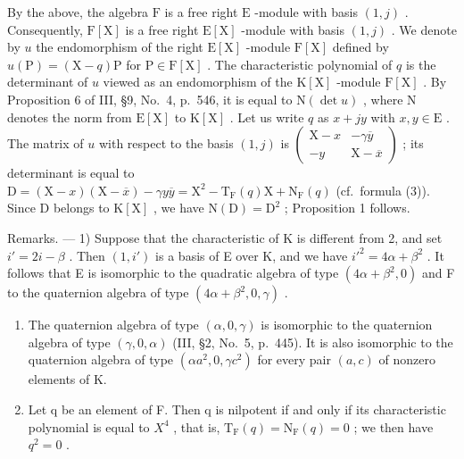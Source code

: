 By the above, the algebra \(\mathrm{F}\) is a free right \(\mathrm{E}\) -module with basis \((1,j)\) . Consequently, \(\mathrm{F}[\mathrm{X}]\) is a free right \(\mathrm{E}[\mathrm{X}]\) -module with basis \((1,j)\) . We denote by \(u\) the endomorphism of the right \(\mathrm{E}[\mathrm{X}]\) -module \(\mathrm{F}[\mathrm{X}]\) defined by \(u(\mathrm{P}) = (\mathrm{X} - q)\mathrm{P}\) for \(\mathrm{P} \in \mathrm{F}[\mathrm{X}]\) . The characteristic polynomial of \(q\) is the determinant of \(u\) viewed as an endomorphism of the \(\mathrm{K}[\mathrm{X}]\) -module \(\mathrm{F}[\mathrm{X}]\) . By Proposition 6 of III, §9, No.~4, p.~546, it is equal to \(\mathrm{N}(\det u)\) , where \(\mathrm{N}\) denotes the norm from \(\mathrm{E}[\mathrm{X}]\) to \(\mathrm{K}[\mathrm{X}]\) . Let us write \(q\) as \(x + jy\) with \(x, y \in \mathrm{E}\) . The matrix of \(u\) with respect to the basis \((1,j)\) is \(\begin{pmatrix} \mathrm{X} - x & -\gamma \overline{y} \\ -y & \mathrm{X} - \overline{x} \end{pmatrix}\) ; its determinant is equal to \(\mathrm{D} = (\mathrm{X} - x)(\mathrm{X} - \overline{x}) - \gamma y\overline{y} = \mathrm{X}^2 - \mathrm{T}_{\mathrm{F}}(q)\mathrm{X} + \mathrm{N}_{\mathrm{F}}(q)\) (cf.~formula (3)). Since \(\mathrm{D}\) belongs to \(\mathrm{K}[\mathrm{X}]\) , we have \(\mathrm{N}(\mathrm{D}) = \mathrm{D}^2\) ; Proposition 1 follows.

Remarks. --- 1) Suppose that the characteristic of K is different from 2, and set \(i' = 2i - \beta\) . Then \((1, i')\) is a basis of E over K, and we have \(i'^2 = 4\alpha + \beta^2\) . It follows that E is isomorphic to the quadratic algebra of type \((4\alpha + \beta^2, 0)\) and F to the quaternion algebra of type \((4\alpha + \beta^2, 0, \gamma)\) .

\begin{enumerate}
\def\labelenumi{\arabic{enumi})}
\setcounter{enumi}{1}
\item
  The quaternion algebra of type \((\alpha,0,\gamma)\) is isomorphic to the quaternion algebra of type \((\gamma,0,\alpha)\) (III, §2, No.~5, p.~445). It is also isomorphic to the quaternion algebra of type \((\alpha a^{2},0,\gamma c^{2})\) for every pair \((a,c)\) of nonzero elements of K.
\item
  Let q be an element of F. Then q is nilpotent if and only if its characteristic polynomial is equal to \(X^{4}\) , that is, \(\mathrm{T}_{\mathrm{F}}(q)=\mathrm{N}_{\mathrm{F}}(q)=0\) ; we then have \(q^{2}=0\) .
\end{enumerate}

